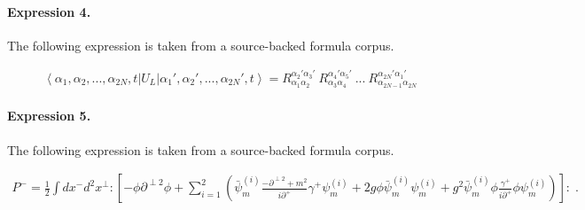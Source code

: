 \documentclass[11pt]{article}
\begin{document}
\paragraph{Expression 4.} The following expression is taken from a source-backed formula corpus.

\begin{align*}\left\langle \alpha _{1},\alpha _{2},...,\alpha _{2N},t\right| U_{L}\left| \alpha _{1}',\alpha _{2}',...,\alpha _{2N}',t\right\rangle =R^{\alpha _{2}'\alpha _{3}'}_{\alpha _{1}\alpha _{2}}\: R^{\alpha _{4}'\alpha _{5}'}_{\alpha _{3}\alpha _{4}}\: ...\: R^{\alpha _{2N}'\alpha _{1}'}_{\alpha _{2N-1}\alpha _{2N}}\end{align*}

\paragraph{Expression 5.} The following expression is taken from a source-backed formula corpus.

\begin{align*}P^-=\frac{1}{2}\int dx^-d^2x^\perp : \left[ -\phi\partial^{\perp2}\phi +\sum_{i=1}^2\left( \bar\psi_{m}^{(i)}\frac{-\partial^{\perp2}+m^2}{i\partial^+}\gamma^+\psi_{m}^{(i)}+ 2g\phi \bar \psi_{m}^{(i)} \psi_{m}^{(i)} +g^2 \bar\psi_{m}^{(i)}\phi \frac{\gamma^+}{i\partial^+}\phi \psi_{m}^{(i)}\right)\right]:\;.\end{align*}
\end{document}
